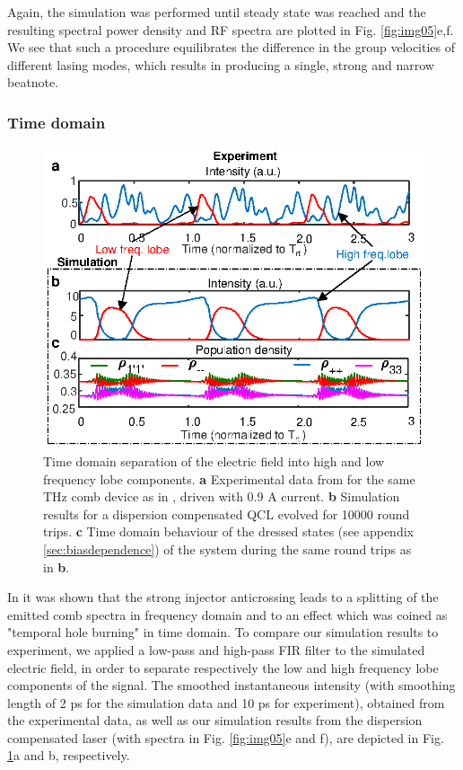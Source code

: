 \documentclass[twocolumn,secnumarabic,amssymb, nobibnotes, aps, prd]{revtex4-1}
\begin{document}
{			Again, the simulation was performed until steady state was reached and the resulting spectral power density and RF spectra are plotted in Fig. \ref{fig:img05}e,f. We see that such a procedure equilibrates the difference in the group velocities of different lasing modes, which results in producing a single, strong and narrow beatnote. 
			
			\subsubsection{Time domain}
			\label{sec:timedomain}
			
			\begin{figure}[h!]
				\begin{center}
					\includegraphics[scale=1]{figs/TEMPHOLEBURNING_EXPERIMENT.eps}
					\caption{ Time domain separation of the electric field into high and low frequency lobe components. \textbf{a} Experimental data from \cite{burghoff2015evaluating} for the same THz comb device as in \cite{burghoff2014terahertz}, driven with 0.9 A current. \textbf{b} Simulation results for a dispersion compensated QCL evolved for 10000 round trips. \textbf{c} Time domain behaviour of the dressed states (see appendix \ref{sec:biasdependence}) of the system during the same round trips as in \textbf{b}.} \label{fig:img06}
				\end{center}	
			\end{figure}	
			
			In \cite{burghoff2015evaluating} it was shown that the strong injector anticrossing leads to a splitting of the emitted comb spectra in frequency domain and to an effect which was coined as "temporal hole burning" in time domain. To compare our simulation results to experiment, we applied a low-pass and high-pass FIR filter to the simulated electric field, in order to separate respectively the low and high frequency lobe components of the signal. The smoothed instantaneous intensity (with smoothing length of 2 ps for the simulation data and 10 ps for experiment), obtained from the experimental data, as well as our simulation results from the dispersion compensated laser (with spectra in Fig. \ref{fig:img05}e and f), are depicted in Fig. \ref{fig:img06}a and b, respectively. 
			
}
\end{document}
